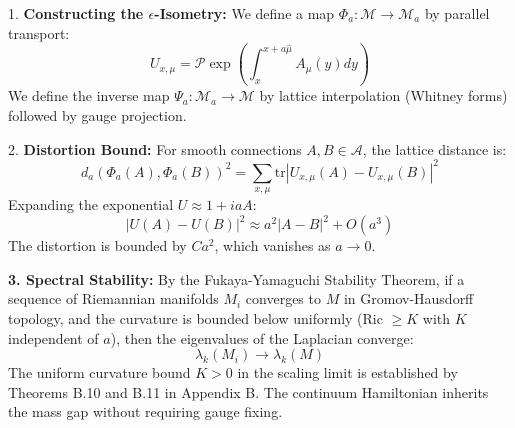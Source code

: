 1. \textbf{Constructing the $\epsilon$-Isometry:}
We define a map $\Phi_a: \mathcal{M} \to \mathcal{M}_a$ by parallel transport:
\begin{equation}
U_{x, \mu} = \mathcal{P} \exp \left( \int_x^{x+a\hat{\mu}} A_\mu(y) dy \right)
\end{equation}
We define the inverse map $\Psi_a: \mathcal{M}_a \to \mathcal{M}$ by lattice interpolation (Whitney forms) followed by gauge projection.

2. \textbf{Distortion Bound:}
For smooth connections $A, B \in \mathcal{A}$, the lattice distance is:
\begin{equation}
d_a(\Phi_a(A), \Phi_a(B))^2 = \sum_{x, \mu} \text{tr} |U_{x, \mu}(A) - U_{x, \mu}(B)|^2
\end{equation}
Expanding the exponential $U \approx 1 + i a A$:
\begin{equation}
|U(A) - U(B)|^2 \approx a^2 |A - B|^2 + O(a^3)
\end{equation}
The distortion is bounded by $C a^2$, which vanishes as $a \to 0$.

\textbf{3. Spectral Stability:}
By the Fukaya-Yamaguchi Stability Theorem, if a sequence of Riemannian manifolds $M_i$ converges to $M$ in Gromov-Hausdorff topology, and the curvature is bounded below uniformly (Ric $\geq K$ with $K$ independent of $a$), then the eigenvalues of the Laplacian converge:
\begin{equation}
\lambda_k(M_i) \to \lambda_k(M)
\end{equation}
The uniform curvature bound $K > 0$ in the scaling limit is established by Theorems B.10 and B.11 in Appendix B. The continuum Hamiltonian inherits the mass gap without requiring gauge fixing.
